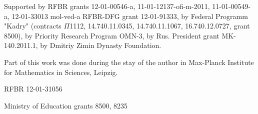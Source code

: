 Supported by RFBR grants 12-01-00546-a, 11-01-12137-ofi-m-2011, 11-01-00549-a, 12-01-33013 mol-ved-a 
RFBR-DFG grant 12-01-91333, by Federal Programm "Kadry" (contracts $\Pi$1112, 14.740.11.0345, 14.740.11.1067, 16.740.12.0727,
grant 8500),  by Priority Research Program OMN-3,                                                                                                                                                                                                                         %
by Rus. President grant MK-140.2011.1, by Dmitriy Zimin Dynasty
Foundation. %

Part of this work was done during the stay of the author
in Max-Planck Institute for Mathematics in Sciences, Leipzig. %

RFBR 12-01-31056 %

Ministry of Education grants 8500, 8235 

